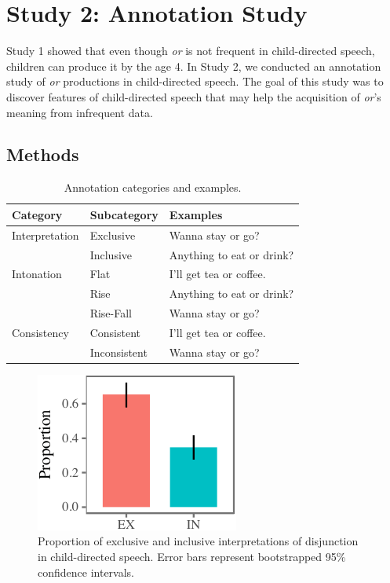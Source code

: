 \documentclass[10pt, letterpaper]{article}
\newenvironment{CodeChunk}{}{}
\begin{document}
\section{Study 2: Annotation Study}\label{study-2-annotation-study}

Study 1 showed that even though \emph{or} is not frequent in
child-directed speech, children can produce it by the age 4. In Study 2,
we conducted an annotation study of \emph{or} productions in
child-directed speech. The goal of this study was to discover features
of child-directed speech that may help the acquisition of \emph{or}'s
meaning from infrequent data.

\subsection{Methods}\label{methods-1}

\begin{table}[b]
\centering
\begin{tabular}{lll}
 Category & Subcategory & Examples \\ 
  \hline
Interpretation & Exclusive & Wanna stay or go? \\ 
   & Inclusive & Anything to eat or drink? \\ 
   \hline
Intonation & Flat & I'll get tea or coffee. \\ 
   & Rise & Anything to eat or drink? \\ 
   & Rise-Fall & Wanna stay or go? \\ 
   \hline
Consistency & Consistent & I'll get tea or coffee. \\ 
   & Inconsistent & Wanna stay or go? \\ 
  \end{tabular}
\caption{Annotation categories and examples.} 
\end{table}

\begin{CodeChunk}
\begin{figure}[b]

{\centering \includegraphics{figs/interpretation-1} 

}

\caption[Proportion of exclusive and inclusive interpretations of disjunction in child-directed speech]{Proportion of exclusive and inclusive interpretations of disjunction in child-directed speech. Error bars represent bootstrapped 95\% confidence intervals.}\label{fig:interpretation}
\end{figure}
\end{CodeChunk}
\end{document}
